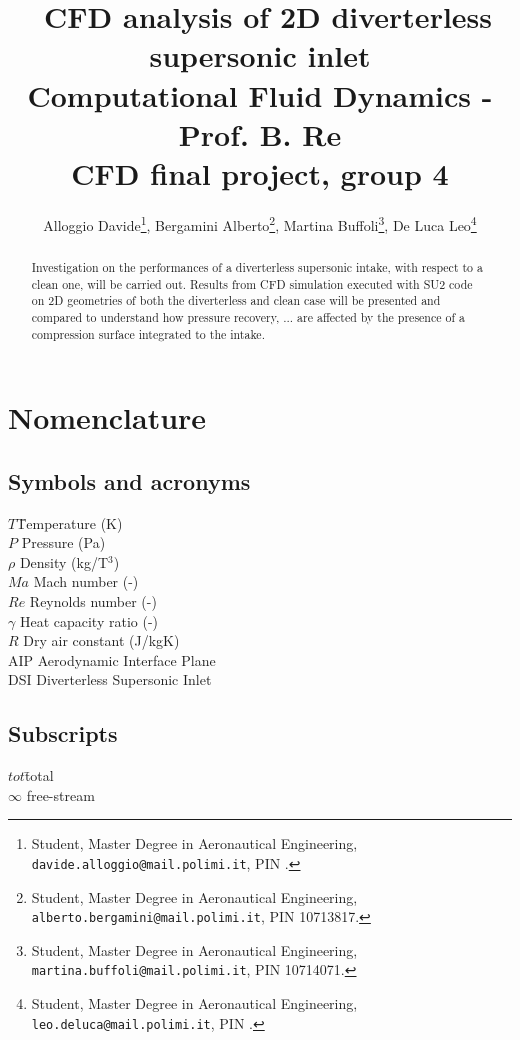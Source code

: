 \documentclass[12pt,a4paper]{article}
\title{\ CFD analysis of 2D diverterless supersonic inlet\\
\vspace{0.25cm}
\large Computational Fluid Dynamics - Prof. B. Re\\
CFD final project, group 4
}
\author{Alloggio Davide\footnote{\footnotesize Student, Master Degree in Aeronautical Engineering, \texttt{davide.alloggio@mail.polimi.it}, PIN .}, Bergamini Alberto\footnote{\footnotesize Student, Master Degree in Aeronautical Engineering, \texttt{alberto.bergamini@mail.polimi.it}, PIN 10713817.}, Martina Buffoli\footnote{\footnotesize Student, Master Degree in Aeronautical Engineering, \texttt{martina.buffoli@mail.polimi.it}, PIN 10714071.}, De Luca Leo\footnote{\footnotesize Student, Master Degree in Aeronautical Engineering, \texttt{leo.deluca@mail.polimi.it}, PIN .}}
\affil{Politecnico di Milano}
\date{}
\begin{document}
\maketitle

\begin{abstract} 

Investigation on the performances of a diverterless supersonic intake, with respect to a clean one, will be carried out. Results from CFD simulation executed with SU2 code on 2D geometries of both the diverterless and clean case will be presented and compared to understand how pressure recovery, ... are affected by the presence of a compression surface integrated to the intake.  

\end{abstract}




\section{Nomenclature}
\vspace{-0.2cm}
\begin{multicols*}{2}
\subsection{Symbols and acronyms}
 \begin{tabbing}
$T$\qquad \= Temperature (K)\\
$P$ \> Pressure (Pa)\\
$\rho$ \> Density (kg/T$^{3}$)\\
$Ma$ \> Mach number (-)\\
$Re$ \> Reynolds number (-) \\ 
$\gamma$ \> Heat capacity ratio (-) \\
$R$ \> Dry air constant (J/kgK) \\
AIP \> Aerodynamic Interface Plane \\
DSI \> Diverterless Supersonic Inlet \\
\end{tabbing}
\vspace{0.3 cm}
\subsection{Subscripts}
\begin{tabbing}
$tot$\qquad \= total \\
$\infty$ \> free-stream \\
\end{tabbing}
\end{multicols*}
\end{document}
